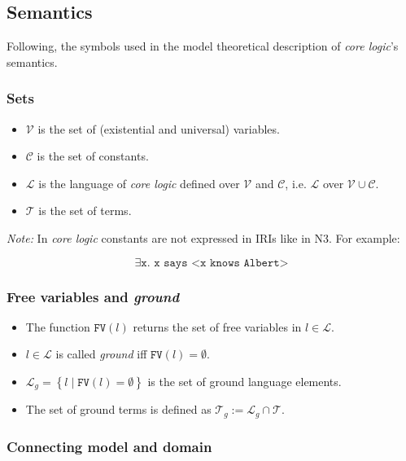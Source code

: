 \documentclass[runningheads]{llncs}
\begin{document}
\subsection{Semantics}
\label{sec:def-core-sem}

Following, the symbols used in the model theoretical description of \emph{core logic}'s semantics.


\subsubsection{Sets}

\begin{itemize}
  \item $\mathcal{V}$ is the set of (existential and universal) variables.
  \item $\mathcal{C}$ is the set of constants.
  \item $\mathcal{L}$ is the language of \emph{core logic} defined over $\mathcal{V}$ and $\mathcal{C}$, i.e. $\mathcal{L}$ over $\mathcal{V} \cup \mathcal{C}$.
  \item $\mathcal{T}$ is the set of terms.
\end{itemize}

\noindent\emph{Note:} In \emph{core logic} constants are not expressed in IRIs like in N3.
For example:

\begin{equation}
  \exists\texttt{x. x says <x knows Albert>}
\end{equation}


\subsubsection{Free variables and \emph{ground}}

\begin{itemize}
  \item The function $\texttt{FV}(l)$ returns the set of free variables in $l \in \mathcal{L}$.
  \item $l \in \mathcal{L}$ is called \emph{ground} iff $\texttt{FV}(l) = \emptyset$.
  \item $\mathcal{L}_g = \left\{l \mid \texttt{FV}(l) = \emptyset\right\}$ is the set of ground language elements.
  \item The set of ground terms is defined as $\mathcal{T}_g := \mathcal{L}_g \cap \mathcal{T}$.
\end{itemize}


\subsubsection{Connecting model and domain}
\end{document}
